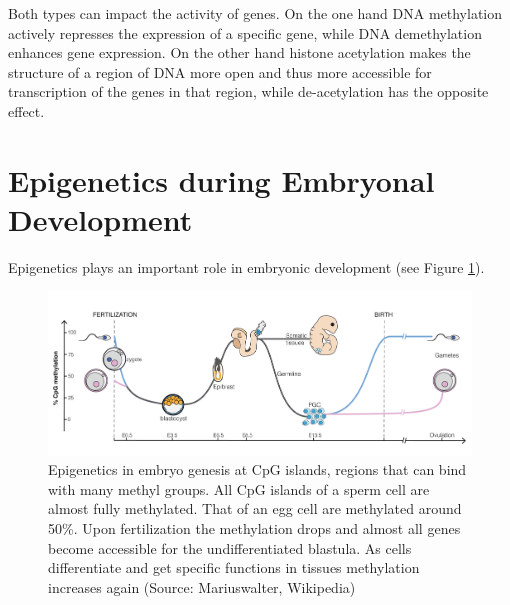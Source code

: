 \documentclass[
  11pt,
]{book}
\begin{document}
Both types can impact the activity of genes.
On the one hand DNA methylation actively represses the expression of a specific gene, while DNA demethylation enhances gene expression.
On the other hand histone acetylation makes the structure of a region of DNA more open and thus more accessible for transcription of the genes in that region, while de-acetylation has the opposite effect.

\hypertarget{epigenetics-during-embryonal-development}{%
\section{Epigenetics during Embryonal Development}\label{epigenetics-during-embryonal-development}}

Epigenetics plays an important role in embryonic development (see Figure \ref{fig:epiEmbryo}).



\begin{figure}

{\centering \includegraphics[width=1\linewidth]{./figs/DNA_methylation_reprogramming} 

}

\caption{Epigenetics in embryo genesis at CpG islands, regions that can bind with many methyl groups. All CpG islands of a sperm cell are almost fully methylated. That of an egg cell are methylated around 50\%. Upon fertilization the methylation drops and almost all genes become accessible for the undifferentiated blastula. As cells differentiate and get specific functions in tissues methylation increases again (Source: Mariuswalter, Wikipedia)}\label{fig:epiEmbryo}
\end{figure}
\end{document}
